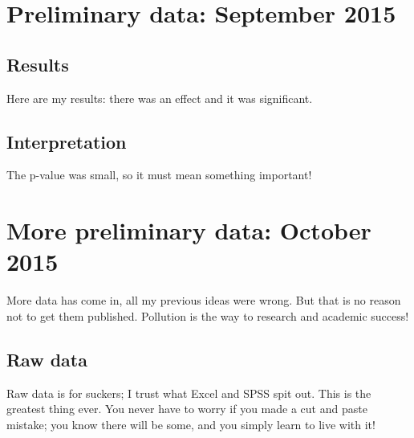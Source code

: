 \section{Preliminary data: September 2015}
\subsection{Results} 
Here are my results: there was an effect and it was significant.

\subsection{Interpretation} 
The p-value was small, so it must mean something important!\lipsum[1]

\section{More preliminary data: October 2015}
More data has come in, all my previous ideas were wrong. But that is no reason not to get them published. Pollution is the way to research and academic success!

\subsection{Raw data}
Raw data is for suckers; I trust what Excel and SPSS spit out.
This is the greatest thing ever. You never have to worry if you made a cut and paste mistake; you know there will be some, and you simply learn to live with it!
